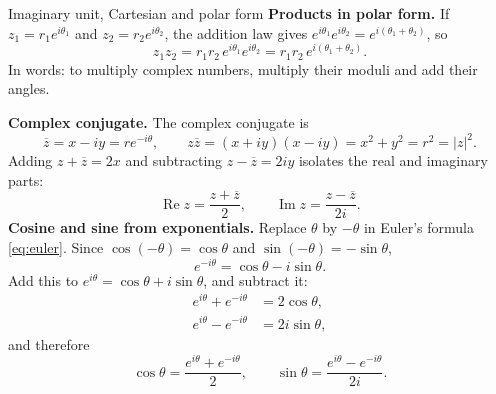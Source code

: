 \documentclass[11pt]{beamer}
\begin{document}
\begin{frame}[allowframebreaks=1.00]{Imaginary unit, Cartesian and polar form}
\textbf{Products in polar form.} If \(z_1=r_1e^{i\theta_1}\) and \(z_2=r_2e^{i\theta_2}\), the
addition law gives \(e^{i\theta_1}e^{i\theta_2}=e^{i(\theta_1+\theta_2)}\), so
\[
  z_1z_2=r_1r_2\,e^{i\theta_1}e^{i\theta_2}=r_1r_2\,e^{i(\theta_1+\theta_2)} .
\]
In words: to multiply complex numbers, multiply their moduli and add their angles.
\par\framebreak\par
\textbf{Complex conjugate.} The complex conjugate is
\[
  \overline z=x-iy=re^{-i\theta},
  \qquad
  z\overline z=(x+iy)(x-iy)=x^2+y^2=r^2=|z|^2.
\]
Adding \(z+\overline z=2x\) and subtracting \(z-\overline z=2iy\) isolates the real and imaginary
parts:
\begin{equation}
  \operatorname{Re}z=\frac{z+\overline z}{2},\qquad
  \operatorname{Im}z=\frac{z-\overline z}{2i}.
  \label{eq:re-im-conj}
\end{equation}
\textbf{Cosine and sine from exponentials.} Replace \(\theta\) by \(-\theta\) in Euler's formula
\eqref{eq:euler}. Since \(\cos(-\theta)=\cos\theta\) and \(\sin(-\theta)=-\sin\theta\),
\[
 e^{-i\theta}=\cos\theta-i\sin\theta .
\]
Add this to \(e^{i\theta}=\cos\theta+i\sin\theta\), and subtract it:
\begin{align*}
  e^{i\theta}+e^{-i\theta}&=2\cos\theta,\\
  e^{i\theta}-e^{-i\theta}&=2i\sin\theta,
\end{align*}
and therefore
\begin{equation}
  \cos\theta=\frac{e^{i\theta}+e^{-i\theta}}{2},\qquad
  \sin\theta=\frac{e^{i\theta}-e^{-i\theta}}{2i}.
  \label{eq:cos-sin-exp}
\end{equation}
\end{frame}
\end{document}
